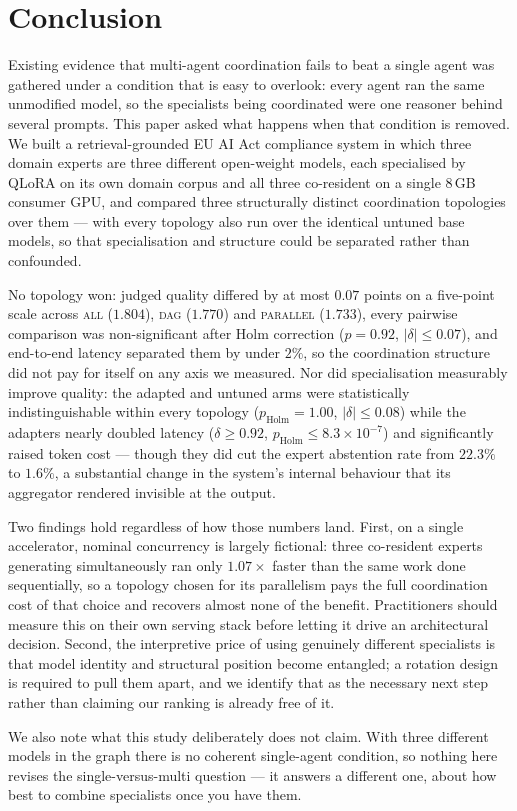 \documentclass[journal,10pt,compsoc,onecolumn]{IEEEtran}
\begin{document}
\section{Conclusion}

Existing evidence that multi-agent coordination fails to beat a single agent was
gathered under a condition that is easy to overlook: every agent ran the same
unmodified model, so the specialists being coordinated were one reasoner behind
several prompts. This paper asked what happens when that condition is removed. We
built a retrieval-grounded EU AI Act compliance system in which three domain
experts are three different open-weight models, each specialised by QLoRA on its
own domain corpus and all three co-resident on a single 8\,GB consumer GPU, and
compared three structurally distinct coordination topologies over them --- with
every topology also run over the identical untuned base models, so that
specialisation and structure could be separated rather than confounded.

No topology won: judged quality differed by at most $0.07$ points on a
five-point scale across \textsc{all} ($1.804$), \textsc{dag} ($1.770$) and
\textsc{parallel} ($1.733$), every pairwise comparison was non-significant after
Holm correction ($p = 0.92$, $|\delta| \leq 0.07$), and end-to-end latency
separated them by under $2\%$, so the coordination structure did not pay for
itself on any axis we measured. Nor did specialisation measurably improve
quality: the adapted and untuned arms were statistically indistinguishable
within every topology ($p_{\text{Holm}} = 1.00$, $|\delta| \leq 0.08$) while the
adapters nearly doubled latency ($\delta \geq 0.92$,
$p_{\text{Holm}} \leq 8.3\times10^{-7}$) and significantly raised token cost ---
though they did cut the expert abstention rate from $22.3\%$ to $1.6\%$, a
substantial change in the system's internal behaviour that its aggregator
rendered invisible at the output.

Two findings hold regardless of how those numbers land. First, on a single
accelerator, nominal concurrency is largely fictional: three co-resident experts
generating simultaneously ran only $1.07\times$ faster than the same work done
sequentially, so a topology chosen for its parallelism pays the full coordination
cost of that choice and recovers almost none of the benefit. Practitioners should
measure this on their own serving stack before letting it drive an architectural
decision. Second, the interpretive price of using genuinely different specialists
is that model identity and structural position become entangled; a rotation design
is required to pull them apart, and we identify that as the necessary next step
rather than claiming our ranking is already free of it.

We also note what this study deliberately does not claim. With three different
models in the graph there is no coherent single-agent condition, so nothing here
revises the single-versus-multi question --- it answers a different one, about how
best to combine specialists once you have them.



\end{document}
